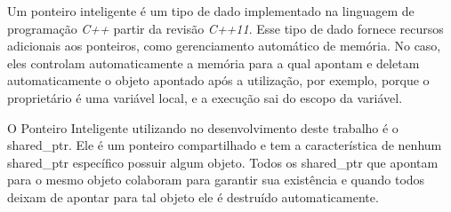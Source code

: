         Um ponteiro inteligente é um tipo de dado implementado na linguagem de programação \textit{C++} partir da revisão \textit{C++11}. Esse tipo de dado fornece recursos adicionais aos ponteiros, como gerenciamento automático de memória. No caso, eles controlam automaticamente a memória para a qual apontam e deletam automaticamente o objeto apontado após a utilização, por exemplo, porque o proprietário é uma variável local, e a execução sai do escopo da variável.~\cite{cppreference}
        
        O Ponteiro Inteligente utilizando no desenvolvimento deste trabalho é o shared\_ptr. Ele é um ponteiro compartilhado e tem a característica de nenhum shared\_ptr específico possuir algum objeto. Todos os shared\_ptr que apontam para o mesmo objeto colaboram para garantir sua existência e quando todos deixam de apontar para tal objeto ele é destruído automaticamente.~\cite{meyers2015} 
        